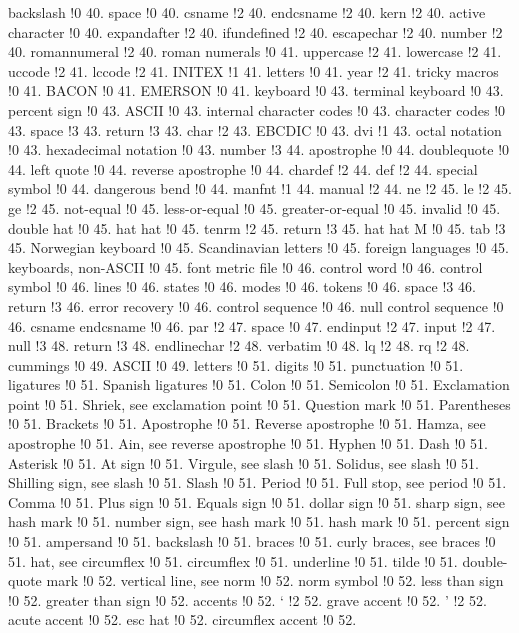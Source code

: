 backslash !0 40.
space !0 40.
csname !2 40.
endcsname !2 40.
kern !2 40.
active character !0 40.
expandafter !2 40.
ifundefined !2 40.
escapechar !2 40.
number !2 40.
romannumeral !2 40.
roman numerals !0 41.
uppercase !2 41.
lowercase !2 41.
uccode !2 41.
lccode !2 41.
INITEX !1 41.
letters !0 41.
year !2 41.
tricky macros !0 41.
BACON !0 41.
EMERSON !0 41.
keyboard !0 43.
terminal keyboard !0 43.
percent sign !0 43.
ASCII !0 43.
internal character codes !0 43.
character codes !0 43.
space !3 43.
return !3 43.
char !2 43.
EBCDIC !0 43.
dvi !1 43.
octal notation !0 43.
hexadecimal notation !0 43.
number !3 44.
apostrophe !0 44.
doublequote !0 44.
left quote !0 44.
reverse apostrophe !0 44.
chardef !2 44.
def !2 44.
special symbol !0 44.
dangerous bend !0 44.
manfnt !1 44.
manual !2 44.
ne !2 45.
le !2 45.
ge !2 45.
not-equal !0 45.
less-or-equal !0 45.
greater-or-equal !0 45.
invalid !0 45.
double hat !0 45.
hat hat !0 45.
tenrm !2 45.
return !3 45.
hat hat M !0 45.
tab !3 45.
Norwegian keyboard !0 45.
Scandinavian letters !0 45.
foreign languages !0 45.
keyboards, non-ASCII !0 45.
font metric file !0 46.
control word !0 46.
control symbol !0 46.
lines !0 46.
states !0 46.
modes !0 46.
tokens !0 46.
space !3 46.
return !3 46.
error recovery !0 46.
control sequence !0 46.
null control sequence !0 46.
csname endcsname !0 46.
par !2 47.
space !0 47.
endinput !2 47.
input !2 47.
null !3 48.
return !3 48.
endlinechar !2 48.
verbatim !0 48.
lq !2 48.
rq !2 48.
cummings !0 49.
ASCII !0 49.
letters !0 51.
digits !0 51.
punctuation !0 51.
ligatures !0 51.
Spanish ligatures !0 51.
Colon !0 51.
Semicolon !0 51.
Exclamation point !0 51.
Shriek, see exclamation point !0 51.
Question mark !0 51.
Parentheses !0 51.
Brackets !0 51.
Apostrophe !0 51.
Reverse apostrophe !0 51.
Hamza, see apostrophe !0 51.
Ain, see reverse apostrophe !0 51.
Hyphen !0 51.
Dash !0 51.
Asterisk !0 51.
At sign !0 51.
Virgule, see slash !0 51.
Solidus, see slash !0 51.
Shilling sign, see slash !0 51.
Slash !0 51.
Period !0 51.
Full stop, see period !0 51.
Comma !0 51.
Plus sign !0 51.
Equals sign !0 51.
dollar sign !0 51.
sharp sign, see hash mark !0 51.
number sign, see hash mark !0 51.
hash mark !0 51.
percent sign !0 51.
ampersand !0 51.
backslash !0 51.
braces !0 51.
curly braces, see braces !0 51.
hat, see circumflex !0 51.
circumflex !0 51.
underline !0 51.
tilde !0 51.
double-quote mark !0 52.
vertical line, see norm !0 52.
norm symbol !0 52.
less than sign !0 52.
greater than sign !0 52.
accents !0 52.
` !2 52.
grave accent !0 52.
' !2 52.
acute accent !0 52.
esc hat !0 52.
circumflex accent !0 52.
